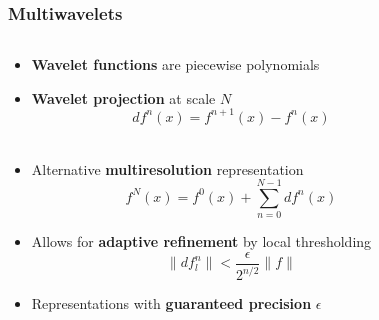 \begin{frame}
    \frametitle{Multiwavelets}
    \tiny
    \begin{columns}
    \begin{column}[b]{0.55\linewidth}
    \begin{itemize}
        \item   \textbf{Wavelet functions} are piecewise polynomials
        \item   \textbf{Wavelet projection} at scale $N$
	    \begin{equation}
	        \nonumber
	        df^n(x) = f^{n+1}(x) - f^{n}(x)
	    \end{equation}
	    \ \\
        \item   Alternative \textbf{multiresolution} representation
	    \begin{equation}
	        \nonumber
	        f^N(x) = f^{0}(x) + \sum_{n=0}^{N-1} df^{n}(x)
	    \end{equation}
        \item   Allows for \textbf{adaptive refinement} by local thresholding
	    \begin{equation}
	        \nonumber
	        \|df_l^n\| < \frac{\epsilon}{2^{n/2}}\|f\|
	    \end{equation}
        \item   Representations with \textbf{guaranteed precision} $\epsilon$
    \end{itemize}
    \ \\
    \ \\
    \end{column}
    \begin{column}[b]{0.45\linewidth}
    \centering

\end{column}
\end{columns}
\end{frame}
